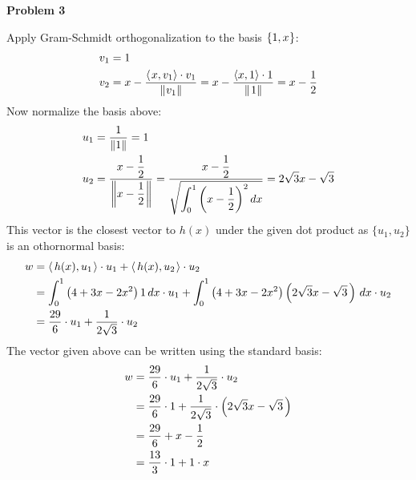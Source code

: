 \documentclass[fleqn]{article}
\newcommand{\problem}[1]{\large\textbf{Problem #1}\normalsize}
\newcommand{\normF}[1]{\left\lVert#1\right\rVert}
\begin{document}
\problem{3}

Apply Gram-Schmidt orthogonalization to the basis $\{ 1, x \kern0.05em \}$:
\begin{align*}
  v_1 &= 1 \\
  v_2 &= x - \dfrac{\langle \kern0.1em x, v_1 \rangle \cdot v_1}{\normF{\kern0.05em v_1}}
       = x - \dfrac{\langle x, 1 \rangle \cdot 1}{\normF{\kern0.1em 1}} 
       = x - \dfrac{1}{2}
\end{align*}
Now normalize the basis above:
\begin{align*}
  \displaystyle
  u_1 &= \dfrac{1}{\normF{1}} = 1 \\
  u_2 &= \dfrac{x - \dfrac{1}{2}}{\kern0.05em \normF{x - \dfrac{1}{2} \kern0.05em}}
       = \dfrac{x - \dfrac{1}{2}}{\sqrt{\displaystyle\int_0^1 \left (x - \dfrac{1}{2} \right )^2 dx}}
       = 2\sqrt{3}x - \sqrt{3}
\end{align*}
This vector is the closest vector to $h(x)$ under the given dot product
as $\{ u_1, u_2 \}$ is an othornormal basis:
\begin{align*}
  w &= \langle \, h(x), u_1 \kern0.1em \rangle \cdot u_1 + \langle \, h(x), u_2 \kern0.1em \rangle \cdot u_2 \\
    &= \int_0^1 \left (4 + 3x - 2x^2 \right )1 \, dx \cdot u_1 +
       \int_0^1 \left (4 + 3x - 2x^2 \right ) \left (2\sqrt{3}x - \sqrt{3} \kern0.15em \right ) \, dx \cdot u_2 \\
    &= \dfrac{29}{6} \cdot u_1 +
       \dfrac{1}{2\sqrt{3}} \cdot u_2
\end{align*}
The vector given above can be written using the standard basis:
\begin{align*}
  w &= \dfrac{29}{6} \cdot u_1 +
       \dfrac{1}{2\sqrt{3}} \cdot u_2 \\
    &= \dfrac{29}{6} \cdot 1 +
       \dfrac{1}{2\sqrt{3}} \cdot \left (2\sqrt{3}x - \sqrt{3} \kern0.15em \right ) \\
    &= \dfrac{29}{6} +
       x - \dfrac{1}{2} \\
    &= \dfrac{13}{3} \cdot 1 +
       1 \cdot x
\end{align*}
\end{document}
